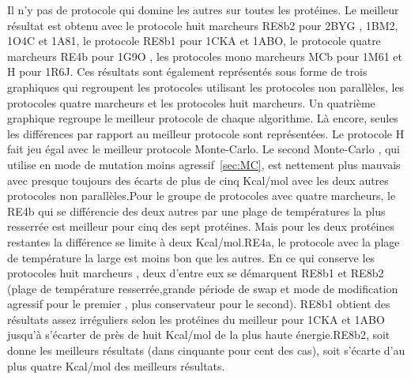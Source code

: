 Il n'y pas de protocole qui domine les autres sur toutes les protéines. Le meilleur résultat est obtenu avec le protocole huit marcheurs RE8b2 pour 2BYG , 1BM2, 1O4C et 1A81, le protocole RE8b1 pour 1CKA et 1ABO, le protocole quatre marcheurs RE4b pour 1G9O , les protocoles mono marcheurs MCb pour 1M61 et H pour 1R6J.  Ces résultats sont également représentés sous forme de trois graphiques qui regroupent les protocoles utilisant les protocoles non parallèles, les protocoles quatre marcheurs et les protocoles huit marcheurs. Un quatrième graphique regroupe le meilleur protocole de chaque algorithme. Là encore, seules les différences par rapport au meilleur protocole sont représentées. Le protocole H fait jeu égal avec le meilleur protocole Monte-Carlo. Le second Monte-Carlo , qui utilise en mode de mutation moins agressif~\ref{sec:MC}, est nettement plus mauvais avec presque toujours des écarts de plus de cinq Kcal/mol avec les deux autres protocoles non parallèles.Pour le groupe de protocoles avec quatre marcheurs, le RE4b qui se différencie des deux autres par une plage de températures la plus resserrée est meilleur pour cinq des sept protéines. Mais pour les deux protéines restantes la différence se limite à deux Kcal/mol.RE4a, le protocole avec la plage de température la large est moins bon que les autres. En ce qui conserve les protocoles huit marcheurs , deux d'entre eux se démarquent RE8b1 et RE8b2 (plage de température resserrée,grande période de swap et mode de modification agressif pour le premier , plus conservateur pour le second). RE8b1 obtient des résultats assez irréguliers selon les protéines du meilleur pour 1CKA et 1ABO jusqu'à s'écarter de près de huit Kcal/mol de la plus haute énergie.RE8b2, soit donne les meilleurs résultats (dans cinquante pour cent des cas), soit s'écarte d'au plus quatre Kcal/mol des meilleurs résultats.  

